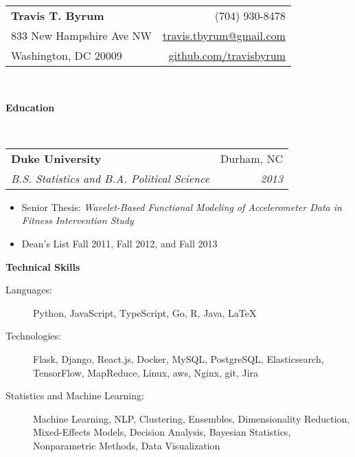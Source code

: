 \documentclass[letterpaper,12pt]{article}
\makeatletter
\newcommand{\resitem}[1]{\item #1 \vspace{-2pt}}
\newcommand{\resheading}[1]{{\large \colorbox{mygrey}{\begin{minipage}{\textwidth}{\textbf{#1 \vphantom{p\^{E}}}}\end{minipage}}}}
\newcommand{\ressubheading}[4]{
\begin{tabular*}{6.9in}{l@{\extracolsep{\fill}}r}
		\textbf{#1} & #2 \\
		\textit{#3} & \textit{#4} \\
\end{tabular*}\vspace{-6pt}}
\makeatother
\begin{document}
\newcommand{\mywebheader}{
\begin{tabular*}
	{7in}
	{l@{\extracolsep{\fill}}r}
		\textbf{\Huge Travis T. Byrum}  & (704) 930-8478\\
		833 New Hampshire Ave NW & \href{mailto:travis.tbyrum@gmail.com}{travis.tbyrum@gmail.com} \\
		Washington, DC 20009 & \href{https://github.com/travisbyrum}{github.com/travisbyrum}\\
\end{tabular*}
\\
\vspace{0.1in}}

\mywebheader
\resheading{Education}
\\
\ressubheading
  {Duke University}
  {Durham, NC}
  {B.S. Statistics and B.A. Political Science}
  {2013}
  {
	  \footnotesize
		  \begin{itemize}
			  \resitem{Senior Thesis: \textit{Wavelet-Based Functional Modeling of Accelerometer Data in Fitness Intervention Study}} 
			  \resitem{Dean's List Fall 2011, Fall 2012, and Fall 2013} 
		  \end{itemize}

\resheading
  {Technical Skills}
	\begin{description}
		\item[Languages:]{\footnotesize Python, JavaScript, TypeScript, Go, R, Java, \LaTeX}
		\item[Technologies:]{\footnotesize Flask, Django, React.js, Docker, MySQL, PostgreSQL, Elasticsearch, TensorFlow, MapReduce, Linux, aws, Nginx, git, Jira}
		\item[Statistics and Machine Learning:]{\footnotesize Machine Learning, NLP, Clustering, Ensembles, Dimensionality Reduction, Mixed-Effects Models, Decision Analysis, Bayesian Statistics, Nonparametric Methods, Data Visualization}
	\end{description}

}
\end{document}
